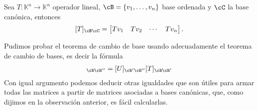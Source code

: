 \documentclass{beamer} %
\newcommand{\Id}{\operatorname{Id}}
\newcommand{\K}{\mathbb K}
\begin{document}



\begin{frame}

\begin{observacion} Sea $T: \K^n \to \K^n$ operador lineal, $\cB = \{v_1,\ldots,v_n\}$ base ordenada y $\cC$ la base canónica,  entonces 
$$
[T]_{\cB\cC} = \begin{bmatrix}
    Tv_1 & Tv_2 & \cdots &Tv_n
\end{bmatrix}.
$$
\end{observacion}\pause
    

\begin{observacion}
Pudimos probar el teorema de cambio de base usando adecuadamente el teorema de cambio de bases, es decir la fórmula
\begin{align*}
    [UT]_{\cB\cB''}=[U]_{\cB'\cB''}[T]_{\cB\cB'}
\end{align*}\pause
Con igual argumento podemos deducir otras igualdades que son útiles para armar todas las matrices a partir de matrices asociadas a bases canónicas, que, como  dijimos en la observación anterior, es fácil calcularlas. 
\end{observacion}
\end{frame}
\end{document}
